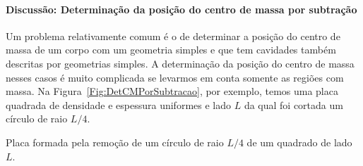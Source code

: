 \paragraph{Discussão: Determinação da posição do centro de massa por subtração}

Um problema relativamente comum é o de determinar a posição do centro de massa de um corpo com um geometria simples e que tem cavidades também descritas por geometrias simples. A determinação da posição do centro de massa nesses casos é muito complicada se levarmos em conta somente as regiões com massa. Na Figura~\ref{Fig:DetCMPorSubtracao}, por exemplo, temos uma placa quadrada de densidade e espessura uniformes e lado $L$ da qual foi cortada um círculo de raio $L/4$.
\begin{marginfigure}
\centering
{}
\caption{Placa formada pela remoção de um círculo de raio $L/4$ de um quadrado de lado $L$.\label{Fig:DetCMPorSubtracao}}
\end{marginfigure}

